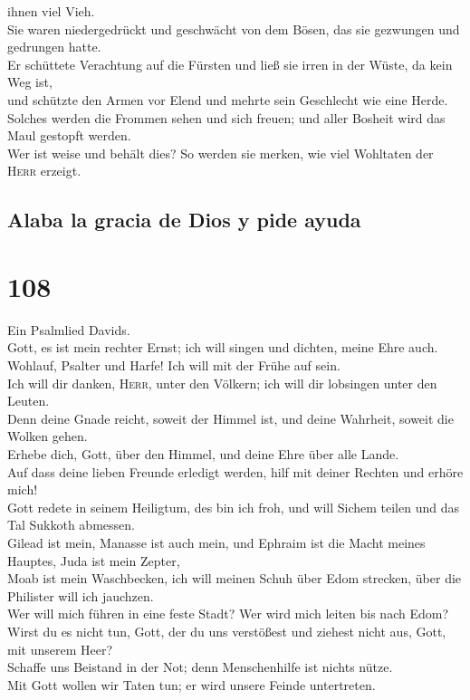 ihnen viel Vieh.\\
 Sie waren niedergedrückt und geschwächt von dem Bösen,
das sie gezwungen und gedrungen hatte.\\
 Er schüttete Verachtung auf die Fürsten und ließ sie
irren in der Wüste, da kein Weg ist,\\
 und schützte den Armen vor Elend und mehrte sein
Geschlecht wie eine Herde.\\
 Solches werden die Frommen sehen und sich freuen; und
aller Bosheit wird das Maul gestopft werden.\\
 Wer ist weise und behält dies? So werden sie merken, wie
viel Wohltaten der \textsc{Herr} erzeigt.

\hypertarget{alaba-la-gracia-de-dios-y-pide-ayuda}{%
\subsection{Alaba la gracia de Dios y pide
ayuda}\label{alaba-la-gracia-de-dios-y-pide-ayuda}}

\hypertarget{section-107}{%
\section{108}\label{section-107}}

 Ein Psalmlied Davids.\\
 Gott, es ist mein rechter Ernst; ich will singen und
dichten, meine Ehre auch.\\
 Wohlauf, Psalter und Harfe! Ich will mit der Frühe auf
sein.\\
 Ich will dir danken, \textsc{Herr}, unter den Völkern;
ich will dir lobsingen unter den Leuten.\\
 Denn deine Gnade reicht, soweit der Himmel ist, und deine
Wahrheit, soweit die Wolken gehen.\\
 Erhebe dich, Gott, über den Himmel, und deine Ehre über
alle Lande.\\
 Auf dass deine lieben Freunde erledigt werden, hilf mit
deiner Rechten und erhöre mich!\\
 Gott redete in seinem Heiligtum, des bin ich froh, und
will Sichem teilen und das Tal Sukkoth abmessen.\\
 Gilead ist mein, Manasse ist auch mein, und Ephraim ist
die Macht meines Hauptes, Juda ist mein Zepter,\\
 Moab ist mein Waschbecken, ich will meinen Schuh über
Edom strecken, über die Philister will ich jauchzen.\\
 Wer will mich führen in eine feste Stadt? Wer wird mich
leiten bis nach Edom?\\
 Wirst du es nicht tun, Gott, der du uns verstößest und
ziehest nicht aus, Gott, mit unserem Heer?\\
 Schaffe uns Beistand in der Not; denn Menschenhilfe ist
nichts nütze.\\
 Mit Gott wollen wir Taten tun; er wird unsere Feinde
untertreten.

